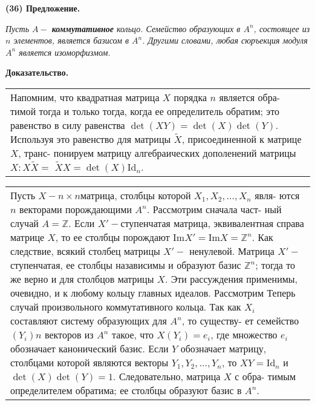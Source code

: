 \documentclass{mai_book}
\begin{document}
	\noindent
	{\bf (36) Предложение.}
	
	{\it Пусть $A - $ {\bf коммутативное} кольцо. Семейство образующих в $A^n$,\linebreak
	состоящее из $n$ элементов, является базисом в $A^n$. Другими словами,\linebreak
	любая сюръекция модуля $A^n$ является изоморфизмом.}
	
	\noindent
	{\bf Доказательство.}
	
	\begin{tabular}{|p{13cm}}
	\noindent
	Напомним, что квадратная матрица $X$ порядка $n$ является обра-\linebreak
	тимой тогда и только тогда, когда ее определитель обратим; это\linebreak
	равенство в силу равенства $\det(XY) = \det(X)\det(Y)$. Используя это\linebreak
	равенство для матрицы $\widetilde{X}$, присоединенной к матрице $X$, транс-\linebreak
	понируем матрицу алгебраических дополенений матрицы $X: X\widetilde{X} = $\linebreak
	$\widetilde{X}X = \det(X) \text{Id}_n$.
	\end{tabular}
	
	\pagebreak
	
	
	\begin{tabular}{|p{12.5cm}}
	\noindent
	Пусть $X - n\times n$матрица, столбцы которой $X_1, X_2, \ldots, X_n$ явля-\linebreak
	ются $n$ векторами порождающими $A^n$. Рассмотрим сначала част-\linebreak
	ный случай $A = \mathbb Z$. Если $X' - $ступенчатая матрица, эквивалентная\linebreak
	справа матрице $X$, то ее столбцы порождают Im$X' = $Im$X = \mathbb Z^n$.\linebreak
	Как следствие, всякий столбец матрицы $X' -$ ненулевой. Матрица\linebreak
	$X' -$ ступенчатая, ее столбцы назависимы и образуют базис $\mathbb Z^n$;\linebreak
	тогда то же верно и для столбцов матрицы $X$. Эти рассуждения\linebreak
	применимы, очевидно, и к любому кольцу главных идеалов.\linebreak
	Рассмотрим Теперь случай произвольного коммутативного кольца.\linebreak
	Так как $X_i$ составляют систему образующих для $A^n$, то существу-\linebreak
	ет семейство $(Y_i) n$ векторов из $A^n$ такое, что $X(Y_i) = e_i$, где\linebreak
	множество $e_i$ обозначает канонический базис. Если $Y$ обозначает\linebreak
	матрицу, столбцами которой являются векторы $Y_1, Y_2, \ldots, Y_n$, то\linebreak
	$XY = \text{Id}_n$ и $\det(X)\det(Y) = 1$. Следовательно, матрица $X$ с обра-\linebreak
	тимым определителем обратима; ее столбцы образуют базис в $A^n$.
	\end{tabular}
	
\end{document}
